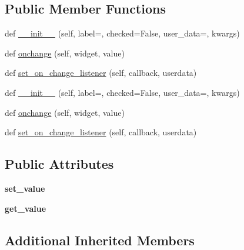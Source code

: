 \subsection*{Public Member Functions}
\begin{DoxyCompactItemize}
\item 
def \hyperlink{classremi_1_1gui_1_1CheckBoxLabel_a65c074b3fdc5a54c906038a6f788aa71}{\+\_\+\+\_\+init\+\_\+\+\_\+} (self, label=\textquotesingle{}\textquotesingle{}, checked=False, user\+\_\+data=\textquotesingle{}\textquotesingle{}, kwargs)
\item 
def \hyperlink{classremi_1_1gui_1_1CheckBoxLabel_af0bf9ccc18775950a3362c4f96250d2d}{onchange} (self, widget, value)
\item 
def \hyperlink{classremi_1_1gui_1_1CheckBoxLabel_a51cc055995154f93ed4483de62d709f7}{set\+\_\+on\+\_\+change\+\_\+listener} (self, callback, userdata)
\item 
def \hyperlink{classremi_1_1gui_1_1CheckBoxLabel_a65c074b3fdc5a54c906038a6f788aa71}{\+\_\+\+\_\+init\+\_\+\+\_\+} (self, label=\textquotesingle{}\textquotesingle{}, checked=False, user\+\_\+data=\textquotesingle{}\textquotesingle{}, kwargs)
\item 
def \hyperlink{classremi_1_1gui_1_1CheckBoxLabel_af0bf9ccc18775950a3362c4f96250d2d}{onchange} (self, widget, value)
\item 
def \hyperlink{classremi_1_1gui_1_1CheckBoxLabel_a51cc055995154f93ed4483de62d709f7}{set\+\_\+on\+\_\+change\+\_\+listener} (self, callback, userdata)
\end{DoxyCompactItemize}
\subsection*{Public Attributes}
\begin{DoxyCompactItemize}
\item 
{\bfseries set\+\_\+value}\hypertarget{classremi_1_1gui_1_1CheckBoxLabel_a345caf89b8a86e8d5daa9eac3f995fbc}{}\label{classremi_1_1gui_1_1CheckBoxLabel_a345caf89b8a86e8d5daa9eac3f995fbc}

\item 
{\bfseries get\+\_\+value}\hypertarget{classremi_1_1gui_1_1CheckBoxLabel_a903f712e42a58feb5a019b4e52cec75c}{}\label{classremi_1_1gui_1_1CheckBoxLabel_a903f712e42a58feb5a019b4e52cec75c}

\end{DoxyCompactItemize}
\subsection*{Additional Inherited Members}


